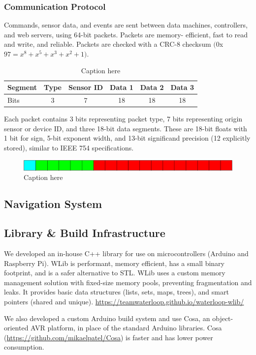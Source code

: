 \documentclass{report}
\begin{document}
    \subsubsection{Communication Protocol}
    Commands, sensor data, and events are sent between data machines, controllers, and web servers, using 64-bit packets. Packets are memory-		efficient, fast to read and write, and reliable. Packets are checked with a CRC-8 checksum $(0$x$97 = x^8 + x^5 + x^3 + x^2 + 1)$.
    \begin{table}[H]
    	\centering
    	\begin{tabular}{@{}lccccc@{}} \toprule
            Segment & Type & Sensor ID & Data 1 & Data 2 & Data 3 \\ \midrule
            Bits & 3 & 7 & 18 & 18 & 18 \\ \bottomrule
        \end{tabular}
        \caption{Caption here}
    \end{table} 
    Each packet contains 3 bits representing packet type, 7 bits representing origin sensor or device ID, and three 18-bit data segments. These are 18-bit floats with 1 bit for sign, 5-bit exponent width, and 13-bit significand precision (12 explicitly stored), similar to IEEE 754 specifications.
	\begin{figure}[H]
        \centering
        \includegraphics[width = \textwidth]{fig326.PNG}
    	\caption{Caption here}
    \end{figure}
    \subsection{Navigation System}
    \subsection{Library \& Build Infrastructure}
    We developed an in-house C++ library for use on microcontrollers (Arduino and Raspberry Pi). WLib is performant, memory efficient, has a small binary footprint, and is a safer alternative to STL. WLib uses a custom memory management solution with fixed-size memory pools, preventing fragmentation and leaks. It provides basic data structures (lists, sets, maps, trees), and smart pointers (shared and unique).
    \url{https://teamwaterloop.github.io/waterloop-wlib/}
    
    We also developed a custom Arduino build system and use Cosa, an object-oriented AVR platform, in place of the standard Arduino libraries. Cosa (\url{https://github.com/mikaelpatel/Cosa}) is faster and has lower power consumption.
\end{document}
